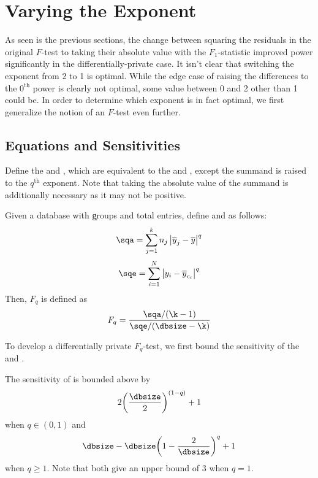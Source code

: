 
\section{Varying the Exponent}
As seen is the previous sections, the change between squaring the residuals in the original $F$-test to taking their absolute value with the $F_1$-statistic improved power significantly in the differentially-private case. It isn't clear that switching the exponent from 2 to 1 is optimal. While the edge case of raising the differences to the $0^{\text{th}}$ power is clearly not optimal, some value between 0 and 2 other than 1 could be. In order to determine which exponent is in fact optimal, we first generalize the notion of an $F$-test even further. 

\subsection{Equations and Sensitivities}
Define the \sqa and \sqe, which are equivalent to the \ssa and \sse, except the summand is raised to the $q^{\text{th}}$ exponent. Note that taking the absolute value of the summand is additionally necessary as it may not be positive. 
\begin{definition}[$F_q$] \label{def:Fq} 
Given a database \x with \k groups and \dbsize total entries, define \sqa and \sqe as follows:
%
\begin{equation*}
\sqa = \sum_{j=1}^k n_j \left\vert \overline{y}_j - \overline{y} \right\vert^q
\end{equation*}
%
\begin{equation*}
\sqe = \sum_{i=1}^N \left\vert y_i - \overline{y}_{c_i} \right\vert^q
\end{equation*}
%
Then, $F_q$ is defined as
%
\begin{equation*}
F_q = \frac{\sqa/(\k-1)}{\sqe/(\dbsize-\k)}
\end{equation*}
%
\end{definition}
To develop a differentially private $F_q$-test, we first bound the sensitivity of the \sqa and \sqe.
\begin{theorem} \label{thm:SQEsens} 
The sensitivity of \sqe is bounded above by
\begin{equation*}
2\bigg(\frac{\dbsize}{2}\bigg)^{(1-q)} + 1
\end{equation*}
when $q \in (0,1)$ and
\begin{equation*}
\dbsize - \dbsize\bigg(1-\frac{2}{\dbsize}\bigg)^q +1 
\end{equation*}
when $q\geq 1$. Note that both give an upper bound of 3 when $q=1$.
\end{theorem}
